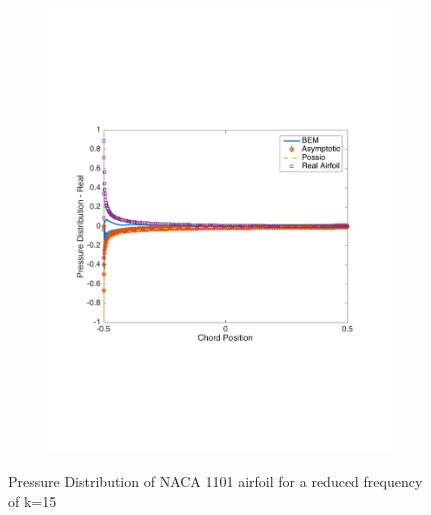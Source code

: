\documentclass{article}
\begin{document}
\begin{figure}[h]
\begin{subfigure}{0.33\textwidth}
	\includegraphics[width = \textwidth, height=0.16\textheight]{NACA1101_pressure_k15real}
\end{subfigure}%
\caption{Pressure Distribution of NACA 1101 airfoil for a reduced frequency of k=15}
\end{figure}
\end{document}
